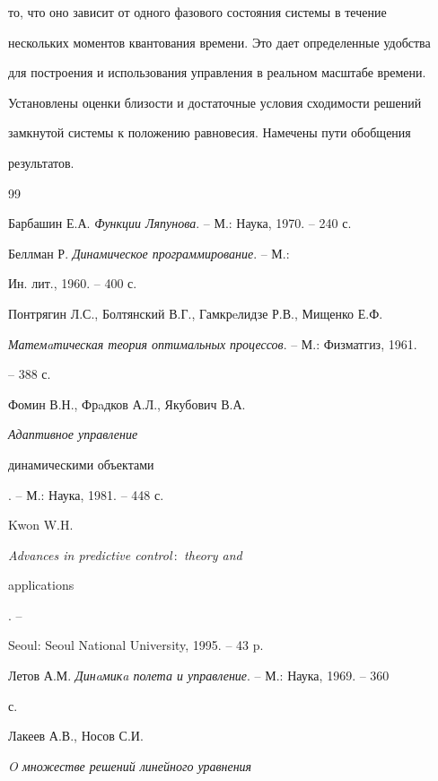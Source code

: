 то, что оно зависит от одного фазового состояния системы в течение 


нескольких моментов квантования времени. Это дает определенные удобства 


для построения и использования управления в реальном масштабе времени. 


Установлены оценки близости и достаточные условия сходимости решений 


замкнутой системы к положению равновесия. Намечены пути обобщения 


результатов. 


 


 


\begin{thebibliography}{99} 


 




Барбашин Е.А. {\em Функции Ляпунова}. -- М.: Наука, 1970. -- 240 с. 




Беллман Р. {\em Динамическое программирование}. -- М.: 


Ин. лит., 1960. -- 400 с. 




Понтрягин Л.С., Болтянский В.Г., Гамкрeлидзе Р.В., Мищенко Е.Ф. 


{\em Матемaтическая теория оптимальных процессов}. -- М.: Физматгиз, 1961. 


-- 388 с. 




Фомин В.Н., Фрaдков А.Л., Якубович В.А. {\em Адаптивное управление 


динамическими объектами}. -- М.: Наука, 1981. -- 448 с. 




Kwon W.H. {\em Advances in predictive control\,$:$ theory and 


applications}. -- 


Seoul: Seoul National University, 1995. -- 43 p. 




Летов А.М. {\em Динaмикa полета и управление}. -- М.: Наука, 1969. -- 360 


с. 




Лакеев А.В., Носов С.И. {\em O множестве решений линейного уравнения 


}
\end{thebibliography}

